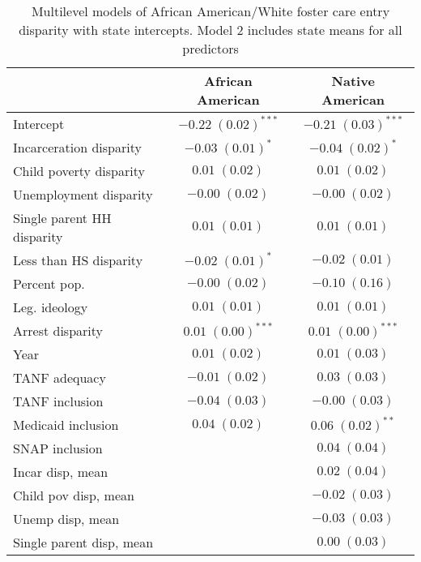 
\begin{table}
\caption{Multilevel models of African American/White foster care entry disparity with state intercepts. Model 2 includes state means for all predictors }
\begin{center}
\begin{tabular}{l c c }
\hline
 & African American & Native American \\
\hline
Intercept                  & $-0.22 \; (0.02)^{***}$ & $-0.21 \; (0.03)^{***}$ \\
Incarceration disparity    & $-0.03 \; (0.01)^{*}$   & $-0.04 \; (0.02)^{*}$   \\
Child poverty disparity    & $0.01 \; (0.02)$        & $0.01 \; (0.02)$        \\
Unemployment disparity     & $-0.00 \; (0.02)$       & $-0.00 \; (0.02)$       \\
Single parent HH disparity & $0.01 \; (0.01)$        & $0.01 \; (0.01)$        \\
Less than HS disparity     & $-0.02 \; (0.01)^{*}$   & $-0.02 \; (0.01)$       \\
Percent pop.               & $-0.00 \; (0.02)$       & $-0.10 \; (0.16)$       \\
Leg. ideology              & $0.01 \; (0.01)$        & $0.01 \; (0.01)$        \\
Arrest disparity           & $0.01 \; (0.00)^{***}$  & $0.01 \; (0.00)^{***}$  \\
Year                       & $0.01 \; (0.02)$        & $0.01 \; (0.03)$        \\
TANF adequacy              & $-0.01 \; (0.02)$       & $0.03 \; (0.03)$        \\
TANF inclusion             & $-0.04 \; (0.03)$       & $-0.00 \; (0.03)$       \\
Medicaid inclusion         & $0.04 \; (0.02)$        & $0.06 \; (0.02)^{**}$   \\
SNAP inclusion             &                         & $0.04 \; (0.04)$        \\
Incar disp, mean           &                         & $0.02 \; (0.04)$        \\
Child pov disp, mean       &                         & $-0.02 \; (0.03)$       \\
Unemp disp, mean           &                         & $-0.03 \; (0.03)$       \\
Single parent disp, mean   &                         & $0.00 \; (0.03)$        \\

\end{tabular}
\end{center}
\end{table}
